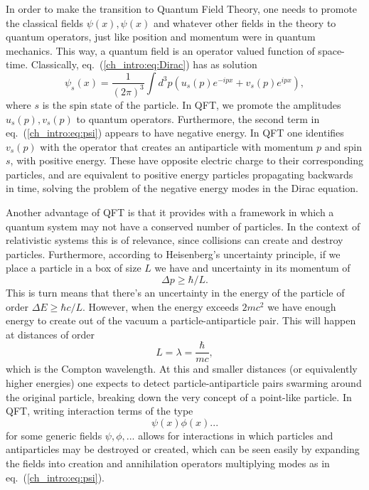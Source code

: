 In order to make the transition to Quantum Field Theory, one needs to promote the classical fields $\psi(x),\psi(x)$ and whatever other fields in the theory to quantum operators, just like position and momentum were in quantum mechanics. This way, a quantum field is an operator valued function of space-time. Classically, eq.~(\ref{ch_intro:eq:Dirac}) has as solution
\begin{equation}
\label{ch_intro:eq:psi}
\psi_s(x)=\frac{1}{(2\pi)^3}\int d^3p\left(u_s(p)e^{-ipx}+v_s(p)e^{ipx}\right),
\end{equation}
where $s$ is the spin state of the particle. In QFT, we promote the amplitudes $u_s(p),v_s(p)$ to quantum operators. Furthermore, the second term in eq.~(\ref{ch_intro:eq:psi}) appears to have negative energy. In QFT one identifies $v_s(p)$ with the operator that creates an antiparticle with momentum $p$ and spin $s$, with positive energy. These have opposite electric charge to their corresponding particles, and are equivalent to positive energy particles propagating backwards in time, solving the problem of the negative energy modes in the Dirac equation.

Another advantage of QFT is that it provides with a framework in which a quantum system may not have a conserved number of particles. In the context of relativistic systems this is of relevance, since collisions can create and destroy particles. Furthermore, according to Heisenberg's uncertainty principle, if we place a particle in a box of size $L$ we have and uncertainty in its momentum of
\begin{equation}
\Delta p\geq\hbar/L.
\end{equation}
This is turn means that there's an uncertainty in the energy of the particle of order $\Delta E\geq\hbar c/L$. However, when the energy exceeds $2mc^2$ we have enough energy to create out of the vacuum a particle-antiparticle pair. This will happen at distances of order 
\begin{equation}
L=\lambda=\frac{\hbar}{mc},
\end{equation}
which is the Compton wavelength. At this and smaller distances (or equivalently higher energies) one expects to detect particle-antiparticle pairs swarming around the original particle, breaking down the very concept of a point-like particle. In QFT, writing interaction terms of the type
\begin{equation}
\psi(x)\phi(x)...
\end{equation}
for some generic fields $\psi,\phi,...$ allows for interactions in which particles and antiparticles may be destroyed or created, which can be seen easily by expanding the fields into creation and annihilation operators multiplying modes as in eq.~(\ref{ch_intro:eq:psi}).

